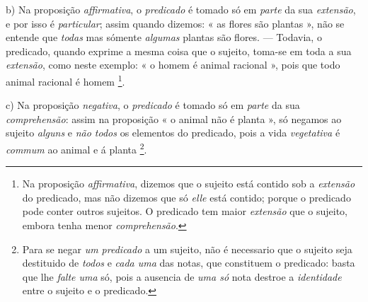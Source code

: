 b) Na proposição \emph{affirmativa}, o \emph{predicado} é tomado só em \emph{parte} da sua \emph{extensão}, e por isso é \emph{particular}; assim quando dizemos: « as flores são plantas », não se entende que \emph{todas} mas sómente \emph{algumas} plantas são flores. --- Todavia, o predicado, quando exprime a mesma coisa que o sujeito, toma-se em toda a sua \emph{extensão}, como neste exemplo: « o homem é animal racional », pois que todo animal racional é homem \footnote{Na proposição \emph{affirmativa}, dizemos que o sujeito está contido sob a \emph{extensão} do predicado, mas não dizemos que só \emph{elle} está contido; porque o predicado pode conter outros sujeitos. O predicado tem maior \emph{extensão} que o sujeito, embora tenha menor \emph{comprehensão}.}.

c) Na proposição \emph{negativa}, o \emph{predicado} é tomado só em \emph{parte} da sua \emph{comprehensão}: assim na proposição « o animal não é planta », só negamos ao sujeito \emph{alguns} e \emph{não todos} os elementos do predicado, pois a vida \emph{vegetativa} é \emph{commum} ao animal e á planta \footnote{Para se negar \emph{um predicado} a um sujeito, não é necessario que o sujeito seja destituido de \emph{todos} e \emph{cada uma} das notas, que constituem o predicado: basta que lhe \emph{falte uma} só, pois a ausencia de \emph{uma só} nota destroe a \emph{identidade} entre o sujeito e o predicado.}.

